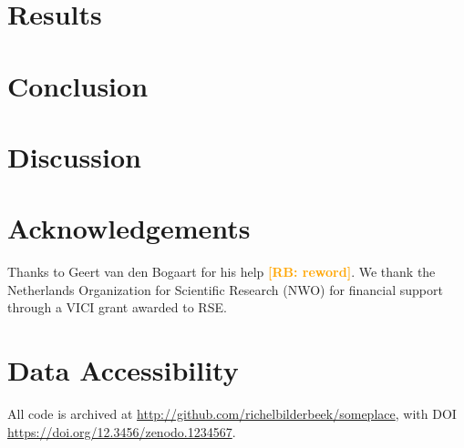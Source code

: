 \documentclass{article}
\newcommand{\richel}[1]{\textcolor{orange}{\textbf{[RB: #1]}}}
\begin{document}
\section{Results}




\section{Conclusion}

\section{Discussion}



\section{Acknowledgements}

Thanks to Geert van den Bogaart for his help \richel{reword}.
We thank the Netherlands 
Organization for Scientific Research (NWO) for financial support 
through a VICI grant awarded to RSE.

\section{Data Accessibility}

All code is archived at \url{http://github.com/richelbilderbeek/someplace},
with DOI \url{https://doi.org/12.3456/zenodo.1234567}.

\end{document}
